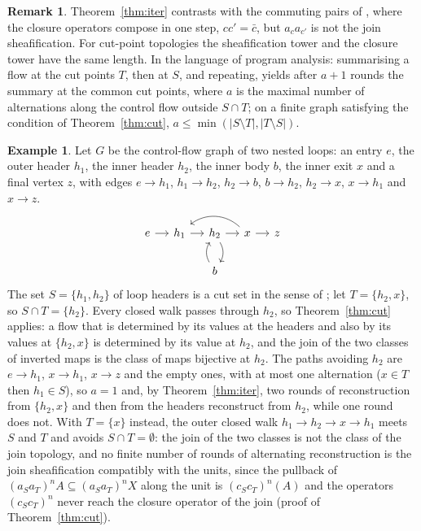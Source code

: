 \documentclass[11pt]{amsart}
\theoremstyle{definition}
\newtheorem{rem}[thm]{Remark}
\newtheorem{ex}[thm]{Example}
\begin{document}
\begin{rem}
Theorem~\ref{thm:iter} contrasts with the commuting pairs of
\cite{Fijoin}, where the closure operators compose in one step,
$cc'=\bar c$, but $a_ca_{c'}$ is not the join sheafification. For
cut-point topologies the sheafification tower and the closure tower have
the same length. In the language of program analysis: summarising a flow
at the cut points $T$, then at $S$, and repeating, yields after $a+1$
rounds the summary at the common cut points, where $a$ is the maximal
number of alternations along the control flow outside $S\cap T$; on a
finite graph satisfying the condition of Theorem~\ref{thm:cut},
$a\le\min(|S\setminus T|,|T\setminus S|)$.
\end{rem}

\begin{ex}\label{ex:loops}
Let $G$ be the control-flow graph of two nested loops: an entry $e$, the
outer header $h_1$, the inner header $h_2$, the inner body $b$, the inner
exit $x$ and a final vertex $z$, with edges $e\to h_1$, $h_1\to h_2$,
$h_2\to b$, $b\to h_2$, $h_2\to x$, $x\to h_1$ and $x\to z$.
\[
\begin{tikzcd}[column sep=small]
e\arrow[r] & h_1\arrow[r] & h_2\arrow[r]\arrow[d,bend left] &
x\arrow[r]\arrow[ll,bend right=40] & z\\
& & b\arrow[u,bend left] &
\end{tikzcd}
\]
The set $S=\{h_1,h_2\}$ of loop headers is a cut set in the sense of
\cite{Bourdoncle}; let $T=\{h_2,x\}$, so $S\cap T=\{h_2\}$. Every closed
walk passes through $h_2$, so Theorem~\ref{thm:cut} applies: a flow
that is determined by its values at the headers and also by its values
at $\{h_2,x\}$ is determined by its value at $h_2$, and the join of the
two classes of inverted maps is the class of maps bijective at $h_2$.
The paths avoiding $h_2$ are $e\to h_1$, $x\to h_1$, $x\to z$ and the
empty ones, with at most one alternation ($x\in T$ then $h_1\in S$), so
$a=1$ and, by Theorem~\ref{thm:iter}, two rounds of reconstruction from
$\{h_2,x\}$ and then from the headers reconstruct from $h_2$, while one
round does not. With $T=\{x\}$ instead, the outer closed walk $h_1\to
h_2\to x\to h_1$ meets $S$ and $T$ and avoids $S\cap T=\emptyset$: the
join of the two classes is not the class of the join topology, and no
finite number of rounds of alternating reconstruction is the join
sheafification compatibly with the units, since the pullback of
$(a_Sa_T)^nA\subseteq(a_Sa_T)^nX$ along the unit is $(c_Sc_T)^n(A)$ and
the operators $(c_Sc_T)^n$ never reach the closure operator of the join
(proof of Theorem~\ref{thm:cut}).
\end{ex}
\end{document}
